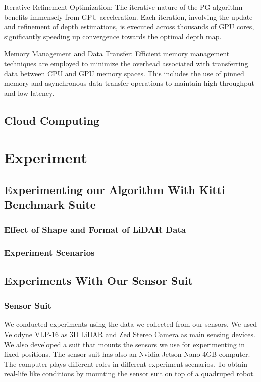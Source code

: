 \documentclass[conference]{IEEEtran}
\begin{document}
Iterative Refinement Optimization: The iterative nature of the PG algorithm benefits immensely from GPU acceleration. Each iteration, involving the update and refinement of depth estimations, is executed across thousands of GPU cores, significantly speeding up convergence towards the optimal depth map.

Memory Management and Data Transfer: Efficient memory management techniques are employed to minimize the overhead associated with transferring data between CPU and GPU memory spaces. This includes the use of pinned memory and asynchronous data transfer operations to maintain high throughput and low latency.

\subsection{Cloud Computing}

\section{Experiment}

\subsection{Experimenting our Algorithm With Kitti Benchmark Suite}

\subsubsection{Effect of Shape and Format of LiDAR Data}
\subsubsection{Experiment Scenarios}

\subsection{Experiments With Our Sensor Suit}

\subsubsection{Sensor Suit}
We conducted experiments using the data we collected from our sensors. We used Velodyne VLP-16 as 3D LiDAR and Zed Stereo Camera as main sensing devices. We also developed a suit that mounts the sensors we use for experimenting in fixed positions. The sensor suit has also an Nvidia Jetson Nano 4GB computer. The computer plays different roles in different experiment scenarios.
To obtain real-life like conditions by mounting the sensor suit on top of a quadruped robot. 
\end{document}
